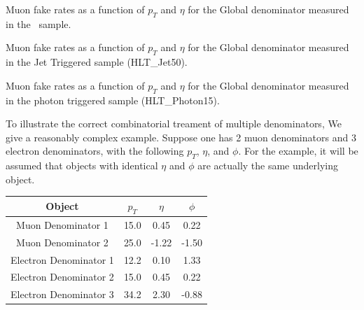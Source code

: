 \documentclass{cmspaper}
\begin{document}
 \begin{table}[ht]
   \begin{center}
     
   \end{center}
   \caption{\label{tab:muonFR_global_wjets} Muon fake rates as a function of $p_T$ and $\eta$ for the Global denominator measured in the \WPlusJets\ sample.}
 \end{table}

\begin{table}[ht]
  \begin{center}
    
  \end{center}
  \caption{\label{tab:muonFR_global_JetTriggerSample} Muon fake rates as a function of $p_T$ and $\eta$ for the Global denominator measured in the Jet Triggered sample (HLT\_Jet50).}
\end{table}

\begin{table}[ht]
  \begin{center}
    
  \end{center}
  \caption{\label{tab:muonFR_global_PhotonTriggerSample} Muon fake rates as a function of $p_T$ and $\eta$ for the Global denominator measured in the photon triggered sample (HLT\_Photon15).}
\end{table}

\clearpage
{} 
\label{app:combinatorics}

To illustrate the correct combinatorial treament of multiple denominators, We give a reasonably complex example. Suppose one has 2 muon denominators and 3 electron denominators, with the following $p_T$, $\eta$, and $\phi$. For the example, it will be assumed that objects with identical $\eta$ and $\phi$ are actually the same underlying object.


\vspace*{0.5cm}
\begin{tabular}{|c|c|c|c|}\hline 
Object & $p_T$ & $\eta$ & $\phi$ \\ 
 \hline 
Muon Denominator 1 & 15.0 & 0.45 & 0.22 \\
Muon Denominator 2 & 25.0 & -1.22 & -1.50 \\
Electron Denominator 1 & 12.2 & 0.10 & 1.33 \\
Electron Denominator 2 & 15.0 & 0.45 & 0.22 \\
Electron Denominator 3 & 34.2 & 2.30 & -0.88 \\
 \hline 
\end{tabular} 
\end{document}

